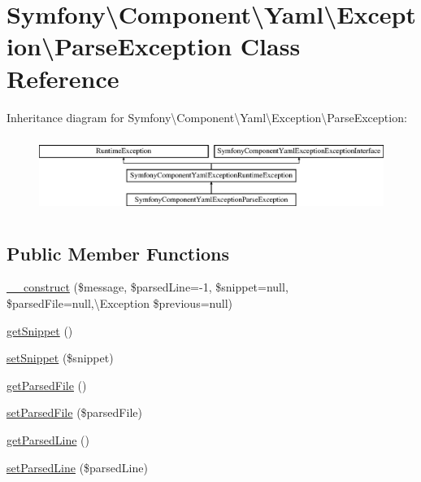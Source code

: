 \hypertarget{classSymfony_1_1Component_1_1Yaml_1_1Exception_1_1ParseException}{}\section{Symfony\textbackslash{}Component\textbackslash{}Yaml\textbackslash{}Exception\textbackslash{}Parse\+Exception Class Reference}
\label{classSymfony_1_1Component_1_1Yaml_1_1Exception_1_1ParseException}
Inheritance diagram for Symfony\textbackslash{}Component\textbackslash{}Yaml\textbackslash{}Exception\textbackslash{}Parse\+Exception\+:\begin{figure}[H]
\begin{center}
\leavevmode
\includegraphics[height=2.500000cm]{classSymfony_1_1Component_1_1Yaml_1_1Exception_1_1ParseException}
\end{center}
\end{figure}
\subsection*{Public Member Functions}
\begin{DoxyCompactItemize}
\item 
\hyperlink{classSymfony_1_1Component_1_1Yaml_1_1Exception_1_1ParseException_aaa5c076f0cc1bae1e9b6375c2d44a58e}{\+\_\+\+\_\+construct} (\$message, \$parsed\+Line=-\/1, \$snippet=null, \$parsed\+File=null,\textbackslash{}Exception \$previous=null)
\item 
\hyperlink{classSymfony_1_1Component_1_1Yaml_1_1Exception_1_1ParseException_a5a1e45087b0f65cc4b1f7133d7bec629}{get\+Snippet} ()
\item 
\hyperlink{classSymfony_1_1Component_1_1Yaml_1_1Exception_1_1ParseException_aa5e107ea62b6cd6475b0a11b17852501}{set\+Snippet} (\$snippet)
\item 
\hyperlink{classSymfony_1_1Component_1_1Yaml_1_1Exception_1_1ParseException_a5d4b0099965d57bd4617cb8ced8c7bec}{get\+Parsed\+File} ()
\item 
\hyperlink{classSymfony_1_1Component_1_1Yaml_1_1Exception_1_1ParseException_acfc4465da9651c320708f34bbb54cbb0}{set\+Parsed\+File} (\$parsed\+File)
\item 
\hyperlink{classSymfony_1_1Component_1_1Yaml_1_1Exception_1_1ParseException_a566aecb2c7e375ff0f8e9f6e2f4aed46}{get\+Parsed\+Line} ()
\item 
\hyperlink{classSymfony_1_1Component_1_1Yaml_1_1Exception_1_1ParseException_a99872c16aafccad4c6a300cb23f08252}{set\+Parsed\+Line} (\$parsed\+Line)
\end{DoxyCompactItemize}


